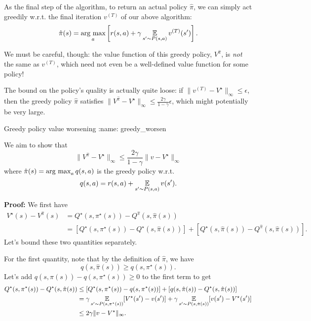 \documentclass[\main/main]{subfiles}
\begin{document}
As the final step of the algorithm, to return an actual policy $\hat \pi$, we can simply act greedily w.r.t. the final iteration $v^{(T)}$ of our above algorithm:
\[
    \hat \pi(s) = \operatorname*{\textrm{arg\ max}}_a \left[ r(s, a) + \gamma \operatorname*{\mathbb{E}}_{s' \sim P(s, a)} v^{(T)}(s') \right].
\]

We must be careful, though: the value function of this greedy policy, $V^{\hat \pi}$, is \emph{not} the same as $v^{(T)}$, which need not even be a well-defined value function for some policy!

The bound on the policy's quality is actually quite loose: if $\|v^{(T)} - V^\star\|_{\infty} \le \epsilon$, then the greedy policy $\hat \pi$ satisfies $\|V^{\hat \pi} - V^\star\|_{\infty} \le \frac{2\gamma}{1-\gamma} \epsilon$, which might potentially be very large.

\begin{theorem}{Greedy policy value worsening}
:name: greedy_worsen

    We aim to show that
    \[
        \|V^{\hat \pi} - V^\star \|_{\infty} \le \frac{2 \gamma}{1-\gamma} \|v - V^\star\|_{\infty}
    \]
    where $\hat \pi(s) = \operatorname*{\textrm{arg\ max}}_a q(s, a)$ is the greedy policy w.r.t. \[ q(s, a) = r(s, a) + \operatorname*{\mathbb{E}}_{s' \sim P(s, a)} v(s'). \]

    \textbf{Proof:} We first have
    \begin{align*}
        V^{\star}(s) - V^{\hat \pi}(s) &= Q^{\star}(s,\pi^\star(s)) - Q^{\hat \pi}(s, \hat \pi(s))\\
        &= [Q^{\star}(s,\pi^\star(s)) - Q^{\star}(s, \hat \pi(s))] + [Q^{\star}(s, \hat \pi(s)) - Q^{\hat \pi}(s, \hat \pi(s))].
    \end{align*}
    Let's bound these two quantities separately.

    For the first quantity, note that by the definition of $\hat \pi$, we have
    \[ q(s, \hat \pi(s)) \ge q(s,\pi^\star(s)). \]
    Let's add $q(s, \hat \pi(s)) - q(s,\pi^\star(s)) \ge 0$ to the first term to get
    \begin{align*}
        Q^{\star}(s,\pi^\star(s)) - Q^{\star}(s, \hat \pi(s)) &\le [Q^{\star}(s,\pi^\star(s))- q(s,\pi^\star(s))] + [q(s, \hat \pi(s)) - Q^{\star}(s, \hat \pi(s))] \\
        &= \gamma \operatorname*{\mathbb{E}}_{s' \sim P(s, \pi^{\star}(s))} [ V^{\star}(s') - v(s') ] + \gamma \operatorname*{\mathbb{E}}_{s' \sim P(s, \hat \pi(s))} [ v(s') - V^{\star}(s') ] \\
        &\le 2 \gamma \|v - V^{\star}\|_{\infty}.
    \end{align*}


\end{theorem}
\end{document}
